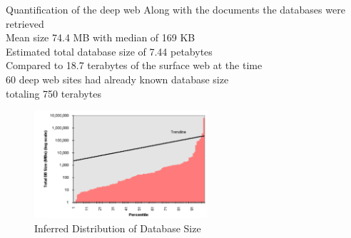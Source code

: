 \documentclass{beamer}
\begin{document}
\begin{frame}[fragile]{Quantification of the deep web}
Along with the documents the databases were retrieved \\
Mean size 74.4 MB with median of 169 KB \\
Estimated total database size of 7.44 petabytes \\
Compared to 18.7 terabytes of the surface web at the time \\
60 deep web sites had already known database size \\
totaling 750 terabytes \\
\begin{figure}
			\includegraphics[height=4cm]{tdbSize.png}
			\caption{\footnotesize{Inferred Distribution of Database  Size}}
\end{figure}

\end{frame}
\end{document}
